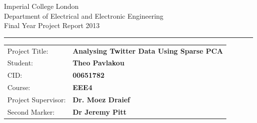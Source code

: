 \documentclass[11pt,a4paper]{article}
\begin{document}
\begin{titlepage}
\setlength{\parindent}{0pt}
\setlength{\parskip}{0pt}

{
\Large
\raggedright
Imperial College London\\[17pt]
Department of Electrical and Electronic Engineering\\[17pt]
Final Year Project Report 2013\\[17pt]

}
\rule{\columnwidth}{3pt}

\vfill

\centering

\vfill

\setlength{\tabcolsep}{0pt}
\begin{tabular}{p{40mm}p{\dimexpr\columnwidth-40mm}}
Project Title: & \textbf{Analysing Twitter Data Using Sparse PCA} \\[12pt]
Student: & \textbf{Theo Pavlakou} \\[12pt]
CID: & \textbf{00651782} \\[12pt]
Course: & \textbf{EEE4} \\[12pt]
Project Supervisor: & \textbf{Dr. Moez Draief} \\[12pt]
Second Marker: & \textbf{Dr Jeremy Pitt} \\
\end{tabular}
\end{titlepage}
\end{document}
